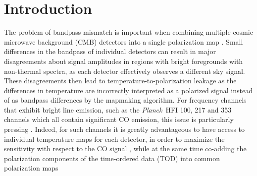 \documentclass{aa}
\def\Planck{\textit{Planck}}
\begin{document}
   \maketitle
   
\section{Introduction}

The problem of bandpass mismatch is important when combining multiple cosmic microwave background (CMB) detectors into a single polarization map \citep[e.g.,][]{page:2007,lfi2015,BP09}. Small differences in the bandpass of individual detectors can result in major disagreements about signal amplitudes in regions with bright foregrounds with non-thermal spectra, as each detector effectively observes a different sky signal. These disagreements then lead to temperature-to-polarization leakage as the differences in temperature are incorrectly interpreted as a polarized signal instead of as bandpass differences by the mapmaking algorithm. For frequency channels that exhibit bright line emission, such as the \Planck\ HFI 100, 217 and 353 channels which all contain significant CO emission, this issue is particularly pressing \citep[e.g.,][]{hfi_processing:2013}. Indeed, for such channels it is greatly advantageous to have access to individual temperature maps for each detector, in order to maximize the sensitivity with respect to the CO signal \citep{planck_co:2014}, while at the same time co-adding the polarization components of the time-ordered data (TOD) into common polarization maps
\end{document}
